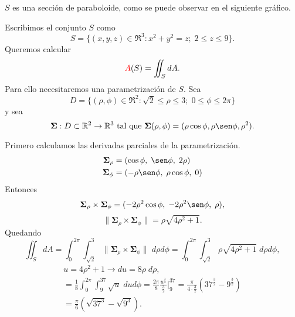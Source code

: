 \begin{solution}
  $S$ es una secci\'on de paraboloide, como se puede observar en el siguiente gr\'afico.

  \begin{center}
  \end{center}

  Escribimos el conjunto $S$ como
  \[
    S=\{(x,y,z)\in \Re^3: x^2+y^2=z;\;2\leq z\leq 9 \}.
  \]
  Queremos calcular \[ \textcolor{red}{A}(S) = \iint_S dA.\]
  Para ello necesitaremos una parametrizaci\'on de $S$. Sea
  $$D=\{(\rho, \phi) \in\Re^2:    \sqrt{2}\leq \rho \leq 3;\;0\leq  \phi \leq 2\pi \}$$  y  sea  $$\boldsymbol{\Sigma}:D \subset\Re^2\to\Re^3  \mbox{ tal que }   \boldsymbol{\Sigma}(\rho, \phi)=(\rho \cos\phi, \rho \sen\phi , \rho^{2}).$$

  Primero calculamos las derivadas parciales de la parametrizaci\'on.
  \begin{align*}
    \boldsymbol{\Sigma}_{\rho} & =(\cos \phi,\;\sen \phi,\; 2\rho)         \\
    \boldsymbol{\Sigma}_\phi   & =(  -\rho \sen \phi,\;\rho \cos \phi,\;0)
  \end{align*}
  Entonces
  $$
    \boldsymbol{\Sigma}_{\rho} \times\boldsymbol{\Sigma}_\phi =
    (-2\rho^2 \cos\phi  , \;-2\rho^2 \sen \phi, \;\rho),
  $$
  $$\|  \boldsymbol{\Sigma}_{\rho} \times\boldsymbol{\Sigma}_\phi\|
    = \rho\sqrt{4\rho^2+1}.$$
  Quedando
  \begin{equation}
    \iint_S dA
    = \int_0^{2\pi} \int_{\sqrt{2}}^3 \|\boldsymbol{\Sigma}_{\rho}
    \times\boldsymbol{\Sigma}_\phi \| \; d\rho d\phi
    = \int_0^{2\pi} \int_{\sqrt{2}}^3 \rho\sqrt{4\rho^2+1}\;d\rho d\phi,
    \label{eq:integral1}
  \end{equation}
  \begin{gather*}
  u=4\rho^2+1 \rightarrow du = 8\rho\;d\rho, 
  \\[.2cm]
  = \frac{1}{8}\int_0^{2\pi} \int_9^{37} \sqrt{u}\;du d\phi
  = \frac{2\pi}{8}\frac{u^{\frac{3}{2}}}{\frac{3}{2}}\Bigg|_9^{37}
  = \frac{\pi}{4\cdot\frac{3}{2}} (37^{\frac{3}{2}} - 9^{\frac{3}{2}}) 
  \\[.2cm]
  = \frac{\pi}{6} (\sqrt{37^3} - \sqrt{9^3}).
  \end{gather*}
\end{solution}

